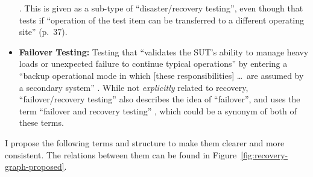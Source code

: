 \begin{itemize}
            \citep[p.~37]{IEEE2021}. This is given as a sub-type of
            ``disaster/recovery testing'', even though that tests if ``operation
            of the test item can be transferred to a different operating site''
            (p.~37).
      \item \textbf{Failover Testing:} Testing that ``validates the SUT's
            ability to manage heavy loads or unexpected failure to continue
            typical operations'' \citep[p.~5-9]{SWEBOK2024} by entering a
            ``backup operational mode in which [these responsibilities] \dots\
            are assumed by a secondary system'' \citepISTQB{}. While not
            \emph{explicitly} related to recovery, ``failover/recovery testing''
            also describes the idea of ``failover'', and \citeauthor{Firesmith2015}
            uses the term ``failover and recovery testing''
            \citeyearpar[p.~56]{Firesmith2015}, which could be a synonym of
            both of these terms.
\end{itemize}

I propose the following terms and structure to make them clearer and more
consistent. The relations between them can be found in
Figure~\ref{fig:recovery-graph-proposed}.

